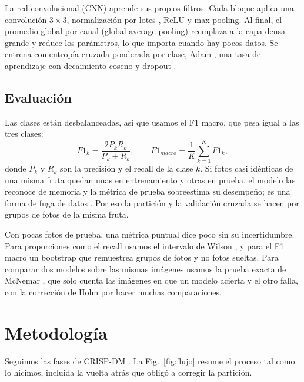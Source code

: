 \documentclass[conference]{IEEEtran}
\begin{document}
La red convolucional (CNN) aprende sus propios filtros. Cada bloque aplica una convolución $3\times3$, normalización por lotes \cite{ioffe2015}, ReLU y max-pooling. Al final, el promedio global por canal (global average pooling) \cite{lin2014} reemplaza a la capa densa grande y reduce los parámetros, lo que importa cuando hay pocos datos. Se entrena con entropía cruzada ponderada por clase, Adam \cite{kingma2015}, una tasa de aprendizaje con decaimiento coseno \cite{loshchilov2017} y dropout \cite{srivastava2014}.

\subsection{Evaluación}
Las clases están desbalanceadas, así que usamos el F1 macro, que pesa igual a las tres clases:
\begin{equation}
F1_k=\frac{2P_kR_k}{P_k+R_k}, \qquad F1_{macro}=\frac{1}{K}\sum_{k=1}^{K}F1_k,
\end{equation}
donde $P_k$ y $R_k$ son la precisión y el recall de la clase $k$. Si fotos casi idénticas de una misma fruta quedan unas en entrenamiento y otras en prueba, el modelo las reconoce de memoria y la métrica de prueba sobreestima su desempeño; es una forma de fuga de datos \cite{kaufman2012}. Por eso la partición y la validación cruzada se hacen por grupos de fotos de la misma fruta.

Con pocas fotos de prueba, una métrica puntual dice poco sin su incertidumbre. Para proporciones como el recall usamos el intervalo de Wilson \cite{wilson1927}, y para el F1 macro un bootstrap \cite{efron1993} que remuestrea grupos de fotos y no fotos sueltas. Para comparar dos modelos sobre las mismas imágenes usamos la prueba exacta de McNemar \cite{mcnemar1947,dietterich1998}, que solo cuenta las imágenes en que un modelo acierta y el otro falla, con la corrección de Holm \cite{holm1979} por hacer muchas comparaciones.

\section{Metodología}

Seguimos las fases de CRISP-DM \cite{chapman2000}. La Fig.~\ref{fig:flujo} resume el proceso tal como lo hicimos, incluida la vuelta atrás que obligó a corregir la partición.
\end{document}
